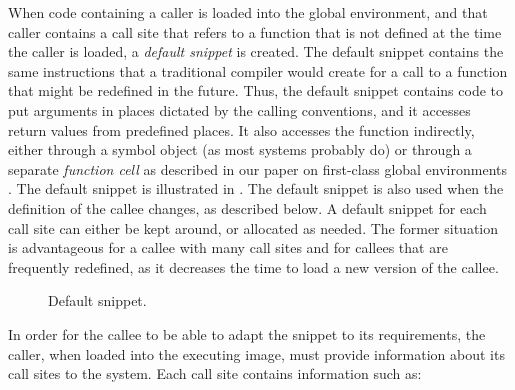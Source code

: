 When code containing a caller is loaded into the global environment,
and that caller contains a call site that refers to a function that is
not defined at the time the caller is loaded, a \emph{default snippet}
is created.  The default snippet contains the same instructions that a
traditional compiler would create for a call to a function that might
be redefined in the future.  Thus, the default snippet contains code
to put arguments in places dictated by the calling conventions, and
it accesses return values from predefined places.  It also accesses
the function indirectly, either through a symbol object (as most
\commonlisp{} systems probably do) or through a separate
\emph{function cell} as described in our paper on first-class global
environments \cite{Strandh:2015:ELS:Environments}.  The default
snippet is illustrated in .  The default
snippet is also used when the definition of the callee changes, as
described below.  A default snippet for each call site can either be
kept around, or allocated as needed.  The former situation is
advantageous for a callee with many call sites and for callees that
are frequently redefined, as it decreases the time to load a new
version of the callee.

\begin{figure}
\begin{center}
\end{center}
\caption{\label{fig-default-snippet}
Default snippet.}
\end{figure}

In order for the callee to be able to adapt the snippet to its
requirements, the caller, when loaded into the executing image, must
provide information about its call sites to the system.  Each call
site contains information such as:

